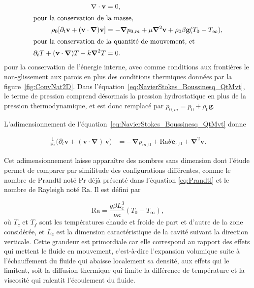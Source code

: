 \begin{subequations} %
	\begin{align}
		\nabla \cdot \mathbf v &= 0, \label{eq:NavierStokes_Boussinesq_Conti}\\
		\intertext{pour la conservation de la masse,}
		\rho_0 [\partial_t \mathbf v + (\mathbf v \cdot \bm\nabla)\mathbf v] &= -\bm\nabla p_{0,m} + \mu \bm\nabla^2 \mathbf v + \rho_0\beta \mathbf g (T_0-T_\infty), \label{eq:NavierStokes_Boussinesq_QtMvt}\\
		\intertext{pour la conservation de la quantité de mouvement, et}
		\partial_t T + (\mathbf v \cdot \bm\nabla) T - k \bm\nabla^2T &= 0. \label{eq:NavierStokes_Boussinesq_NRJinterne}
	\end{align}
	\label{eq:NavierStokes_Boussinesq}%
\end{subequations}
pour la conservation de l'énergie interne, avec comme conditions aux frontières le non-glissement aux parois en plus des conditions thermiques données par la figure~\ref{fig:ConvNat2D}. Dans l'équation~\eqref{eq:NavierStokes_Boussinesq_QtMvt}, le terme de pression comprend désormais la pression hydrostatique en plus de la pression thermodynamique, et est donc remplacé par $p_{0,m}=p_{0}+\rho_{0}\mathbf{g}$.

L'adimensionnement de l'équation~\eqref{eq:NavierStokes_Boussinesq_QtMvt} donne

\begin{subequations}
	\begin{align}
		\frac{1}{\mathrm{Pr}}\big(\partial_t \mathbf{v} + (\mathbf{v} \cdot \bm\nabla)\,\mathbf{v}\big) &= -\bm\nabla p_{m,0} + \mathrm{Ra} \theta \mathbf e_{z,0} + \bm\nabla^2 \mathbf{v}. \label{eq:NonDim_NavierStokes_Boussinesq_QtMvt}
	\end{align}
\end{subequations}

Cet adimensionnement laisse apparaître des nombres sans dimension dont l'étude permet de comparer par similitude des configurations différentes, comme le nombre de Prandtl noté $\mathrm{Pr}$ déjà présenté dans l'équation \eqref{eq:Prandtl} et le nombre de Rayleigh noté $\mathrm{Ra}$. Il est défini par 

\begin{equation}
	\mathrm{Ra} = \frac{g \beta L_c^3}{\nu \kappa} (T_{0}-T_{\infty}),
	\label{eq:NbrRayleigh}
\end{equation}
où $T_c$ et $T_f$ sont les températures chaude et froide de part et d'autre de la zone considérée, et $L_c$ est la dimension caractéristique de la cavité suivant la direction verticale. Cette grandeur est primordiale car elle correspond au rapport des effets qui mettent le fluide en mouvement, c'est-à-dire l'expansion volumique suite à l'échauffement du fluide qui abaisse localement sa densité, aux effets qui le limitent, soit la diffusion thermique qui limite la différence de température et la viscosité qui ralentit l'écoulement du fluide. 

